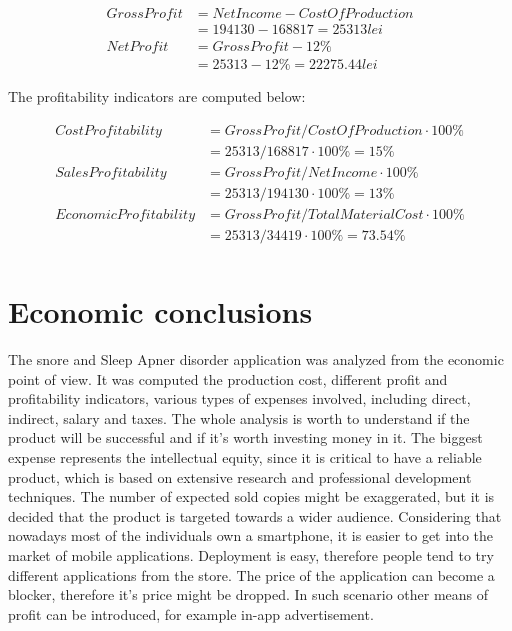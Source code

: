 \documentclass[12pt,a4paper]{report}
\begin{document}
\begin{equation}
 \begin{split}
  Gross Profit &= Net Income - Cost Of Production\\
              &= 194130 - 168817 = 25313 lei\\              
  Net Profit &= Gross Profit - 12\% \\
             &= 25313 - 12\% = 22275.44 lei
 \end{split}
\end{equation}

The profitability indicators are computed below:

\begin{equation}
 \begin{split}
  Cost Profitability &= Gross Profit / Cost Of Production \cdot 100\%\\
              &= 25313 / 168817 \cdot 100\% = 15 \%\\              
  SalesProfitability &= Gross Profit / Net Income \cdot 100\% \\
             &= 25313 / 194130 \cdot 100\% = 13 \%\\
  EconomicProfitability &= Gross Profit / Total Material Cost \cdot 100\%\\
                        &= 25313 / 34419 \cdot 100\% = 73.54 \%\\
 \end{split}
\end{equation}

\section{Economic conclusions}
The snore and Sleep Apner disorder application was analyzed from the economic point of view. It was computed the production cost, different profit and profitability indicators, various types of expenses involved, including direct, indirect, salary and taxes. The whole analysis is worth to understand if the product will be successful and if it's worth investing money in it. The biggest expense represents the intellectual equity, since it is critical to have a reliable product, which is based on extensive research and professional development techniques. The number of expected sold copies might be exaggerated, but it is decided that the product is targeted towards a wider audience. Considering that nowadays most of the individuals own a smartphone, it is easier to get into the market of mobile applications. Deployment is easy, therefore people tend to try different applications from the store. The price of the application can become a blocker, therefore it's price might be dropped. In such scenario other means 
of profit can be introduced, for example in-app advertisement. 
\end{document}
